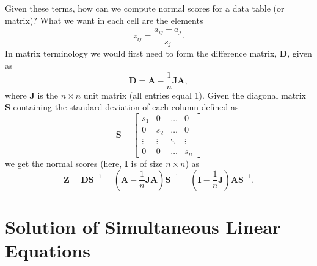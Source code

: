 Given these terms, how can we compute normal scores for a data table (or matrix)?  What we want in 
each cell are the elements
\begin{equation}
z_{ij} = \frac{a_{ij} - \bar{a}_j}{s_j}.
\end{equation} 
In matrix terminology we would first need to form the difference matrix, $\mathbf{D}$, given as
\begin{equation}
\mathbf{D = A} - \frac{1}{n}\mathbf{JA},
\end{equation}
where $\mathbf{J}$ is the $n \times n$ unit matrix (all entries equal 1).
Given the diagonal matrix $\mathbf{S}$ containing the standard deviation of each column defined as
\begin{equation}
\mathbf{S} = 
\left [ \begin{array}{cccc}
s_1 & 0 & \ldots & 0 \\
0 & s_2 & \ldots & 0 \\
\vdots & \vdots &  \ddots  & \vdots\\
0 & 0 & \ldots & s_n
\end{array} \right]
\end{equation}
we get the normal scores (here, $\mathbf{I}$ is of size $n \times n$) as
\begin{equation}
\mathbf{Z = DS}^{-1} = \left ( \mathbf{A} - \frac{1}{n} \mathbf{JA} \right) \mathbf{S}^{-1} = \left ( \mathbf{I} - \frac{1}{n} \mathbf{J} \right)
\mathbf{AS}^{-1}.
\end{equation}

\section{Solution of Simultaneous Linear Equations}


